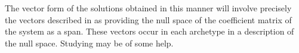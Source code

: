 The vector form of the solutions obtained in this manner will involve precisely the vectors described in  as providing the null space of the coefficient matrix of the system as a span.  These vectors occur in each archetype in a description of the null space.  Studying  may be of some help.


